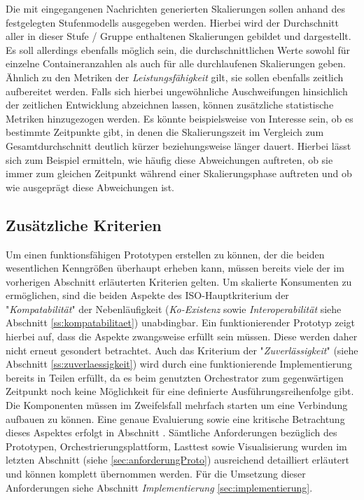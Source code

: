 
Die mit eingegangenen Nachrichten generierten Skalierungen sollen anhand des festgelegten Stufenmodells ausgegeben werden. Hierbei wird der Durchschnitt aller in dieser Stufe / Gruppe enthaltenen Skalierungen gebildet und dargestellt. Es soll allerdings ebenfalls möglich sein, die durchschnittlichen Werte sowohl für einzelne Containeranzahlen als auch für alle durchlaufenen Skalierungen geben. Ähnlich zu den Metriken der \emph{Leistungsfähigkeit} gilt, sie sollen ebenfalls zeitlich aufbereitet werden. Falls sich hierbei ungewöhnliche Auschweifungen hinsichlich der zeitlichen Entwicklung abzeichnen lassen, können zusätzliche statistische Metriken hinzugezogen werden. Es könnte beispielsweise von Interesse sein, ob es bestimmte Zeitpunkte gibt, in denen die Skalierungszeit im Vergleich zum Gesamtdurchschnitt deutlich kürzer beziehungsweise länger dauert. Hierbei lässt sich zum Beispiel ermitteln, wie häufig diese Abweichungen auftreten, ob sie immer zum gleichen Zeitpunkt während einer Skalierungsphase auftreten und ob wie ausgeprägt diese Abweichungen ist.


\subsection{Zusätzliche Kriterien \checkmark}
Um einen funktionsfähigen Prototypen erstellen zu können, der die beiden wesentlichen Kenngrößen überhaupt erheben kann, müssen bereits viele der im vorherigen Abschnitt erläuterten Kriterien gelten. Um skalierte Konsumenten zu ermöglichen, sind die beiden Aspekte des ISO-Hauptkriterium der "\emph{Kompatabilität}" der Nebenläufigkeit (\emph{Ko-Existenz} sowie \emph{Interoperabilität} siehe Abschnitt \ref{ss:kompatabilitaet}) unabdingbar. Ein funktionierender Prototyp zeigt hierbei auf, dass die Aspekte zwangsweise erfüllt sein müssen. Diese werden daher nicht erneut gesondert betrachtet. Auch das Kriterium der "\emph{Zuverlässigkeit}" (siehe Abschnitt \ref{ss:zuverlaessigkeit}) wird durch eine funktionierende Implementierung bereits in Teilen erfüllt, da es beim genutzten Orchestrator zum gegenwärtigen Zeitpunkt noch keine Möglichkeit für eine definierte Ausführungsreihenfolge gibt. Die Komponenten müssen im Zweifelsfall mehrfach starten um eine Verbindung aufbauen zu können. Eine genaue Evaluierung sowie eine kritische Betrachtung dieses Aspektes erfolgt in Abschnitt . Sämtliche Anforderungen bezüglich des Prototypen, Orchestrierungsplattform, Lasttest sowie Visualisierung wurden im letzten Abschnitt (siehe \ref{sec:anforderungProto}) ausreichend detailliert erläutert und können komplett übernommen werden. Für die Umsetzung dieser Anforderungen siehe Abschnitt \emph{Implementierung} \ref{sec:implementierung}.

